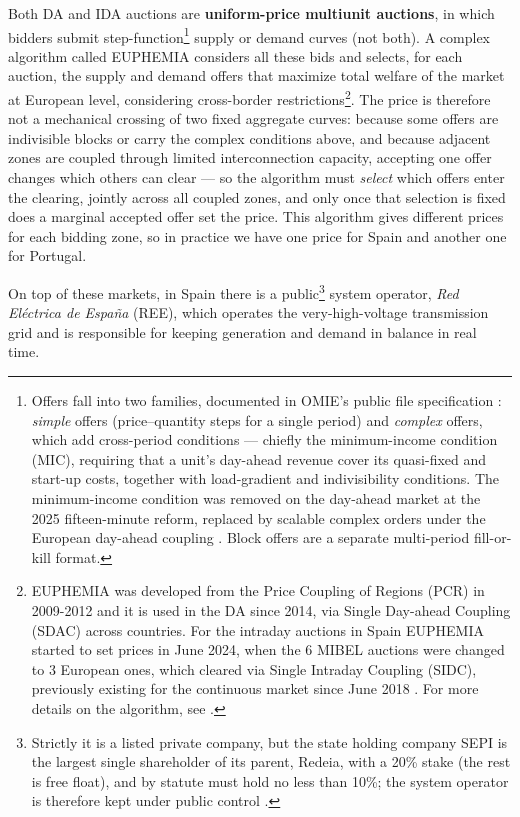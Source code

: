 \documentclass[11pt,a4paper]{article}
\theoremstyle{definition}
\theoremstyle{remark}
\theoremstyle{plain}
\begin{document}
Both DA and IDA auctions are \textbf{uniform-price multiunit auctions}, in which bidders submit step-function\footnote{Offers fall into two families, documented in OMIE's public file specification \citep{omie_ficheros_2025}: \emph{simple} offers (price--quantity steps for a single period) and \emph{complex} offers, which add cross-period conditions --- chiefly the minimum-income condition (MIC), requiring that a unit's day-ahead revenue cover its quasi-fixed and start-up costs, together with load-gradient and indivisibility conditions. The minimum-income condition was removed on the day-ahead market at the 2025 fifteen-minute reform, replaced by scalable complex orders under the European day-ahead coupling \citep{boe_a_2025_4908}. Block offers are a separate multi-period fill-or-kill format.} supply or demand curves (not both). A complex algorithm called EUPHEMIA considers all these bids and selects, for each auction, the supply and demand offers that maximize total welfare of the market at European level, considering cross-border restrictions\footnote{EUPHEMIA was developed from the Price Coupling of Regions (PCR) in 2009-2012 and it is used in the DA since 2014, via Single Day-ahead Coupling (SDAC) across countries. For the intraday auctions in Spain EUPHEMIA started to set prices in June 2024, when the 6 MIBEL auctions were changed to 3 European ones, which cleared via Single Intraday Coupling (SIDC), previously existing for the continuous market since June 2018 \citep{cnmc_sidc_ida_2024}. For more details on the algorithm, see \citet{euphemia_2025}.}. The price is therefore not a mechanical crossing of two fixed aggregate curves: because some offers are indivisible blocks or carry the complex conditions above, and because adjacent zones are coupled through limited interconnection capacity, accepting one offer changes which others can clear --- so the algorithm must \emph{select} which offers enter the clearing, jointly across all coupled zones, and only once that selection is fixed does a marginal accepted offer set the price. This algorithm gives different prices for each bidding zone, so in practice we have one price for Spain and another one for Portugal.

On top of these markets, in Spain there is a public\footnote{Strictly it is a listed private company, but the state holding company SEPI is the largest single shareholder of its parent, Redeia, with a 20\% stake (the rest is free float), and by statute must hold no less than 10\%; the system operator is therefore kept under public control \citep{redeia_shareholders_2025}.} system operator, \textit{Red Eléctrica de España} (REE), which operates the very-high-voltage transmission grid and is responsible for keeping generation and demand in balance in real time.
\end{document}
